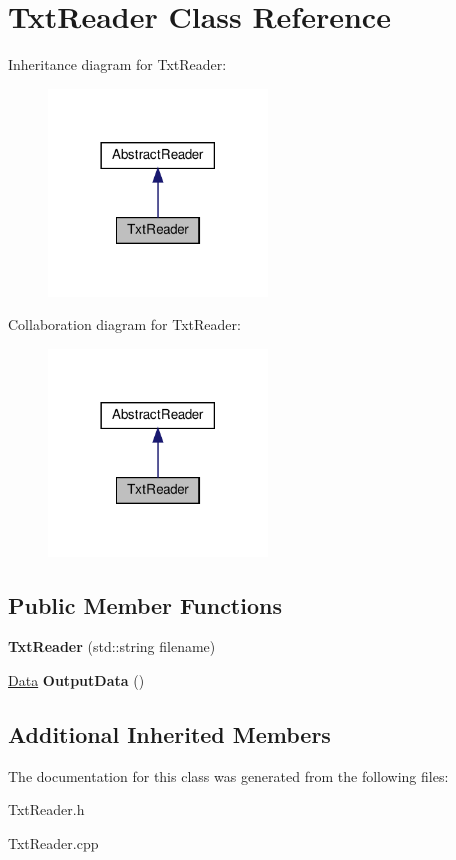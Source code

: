\hypertarget{classTxtReader}{}\section{Txt\+Reader Class Reference}
\label{classTxtReader}


Inheritance diagram for Txt\+Reader\+:\nopagebreak
\begin{figure}[H]
\begin{center}
\leavevmode
\includegraphics[width=165pt]{classTxtReader__inherit__graph}
\end{center}
\end{figure}


Collaboration diagram for Txt\+Reader\+:\nopagebreak
\begin{figure}[H]
\begin{center}
\leavevmode
\includegraphics[width=165pt]{classTxtReader__coll__graph}
\end{center}
\end{figure}
\subsection*{Public Member Functions}
\begin{DoxyCompactItemize}
\item 
\mbox{\label{classTxtReader_acbef0ef9c6034581d76a3b9e305f1508}} 
{\bfseries Txt\+Reader} (std\+::string filename)
\item 
\mbox{\label{classTxtReader_a30786dcd83c2f24dd26e83cb5fd934ab}} 
\hyperlink{structData}{Data} {\bfseries Output\+Data} ()
\end{DoxyCompactItemize}
\subsection*{Additional Inherited Members}


The documentation for this class was generated from the following files\+:\begin{DoxyCompactItemize}
\item 
Txt\+Reader.\+h\item 
Txt\+Reader.\+cpp\end{DoxyCompactItemize}
